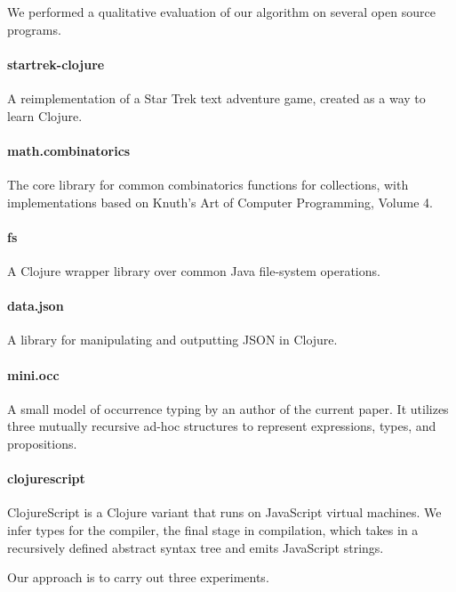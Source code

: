
We performed a qualitative evaluation of our algorithm
on several open source programs.

\paragraph{startrek-clojure}
A reimplementation of a Star Trek text adventure game,
created as a way to learn Clojure.

\paragraph{math.combinatorics}
The core library for common combinatorics functions
for collections,
with implementations based on Knuth's Art of Computer
Programming, Volume 4.

\paragraph{fs}
A Clojure wrapper library over common Java file-system operations.

\paragraph{data.json}
A library for manipulating and outputting JSON in Clojure.


\paragraph{mini.occ}
A small model of occurrence typing by an author of the
current paper. It utilizes three mutually recursive
ad-hoc structures to represent expressions, types,
and propositions.

\paragraph{clojurescript}
ClojureScript is a Clojure variant that runs on JavaScript
virtual machines. We infer types for the compiler, the final
stage in compilation, which takes in a recursively
defined abstract syntax tree and emits JavaScript strings.

Our approach is to carry out three experiments.

